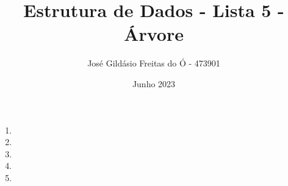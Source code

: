 

\title{Estrutura de Dados - Lista 5 - Árvore}
\author{José Gildásio Freitas do Ó - 473901}
\date{Junho 2023}


	
	\maketitle
	
	\begin{enumerate}
		\item 
		\item 
		\item 
		\item 
		\item 	
	\end{enumerate}
	
